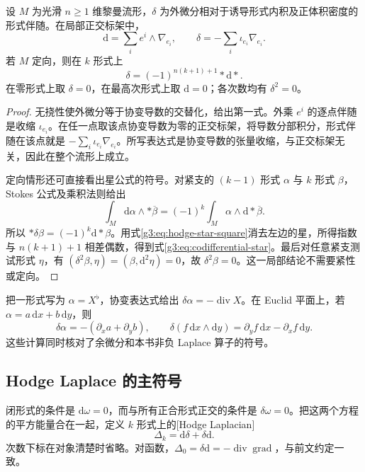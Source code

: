 \begin{proposition}\label{g3:prop:codifferential-star}
	设 \(M\) 为光滑 \(n\ge1\) 维黎曼流形，\(\delta\) 为外微分相对于诱导形式内积及正体积密度的形式伴随。在局部正交标架中，
	\begin{equation}\label{g3:eq:form-covariant-d-delta}
		\mathrm d=\sum_i e^i\wedge\nabla_{e_i},
		\qquad
		\delta=-\sum_i\iota_{e_i}\nabla_{e_i}.
	\end{equation}
	若 \(M\) 定向，则在 \(k\) 形式上
	\begin{equation}\label{g3:eq:codifferential-star}
		\delta=(-1)^{n(k+1)+1}*\mathrm d*.
	\end{equation}
	在零形式上取 \(\delta=0\)，在最高次形式上取 \(\mathrm d=0\)；各次数均有 \(\delta^2=0\)。
\end{proposition}
\begin{proof}
	无挠性使外微分等于协变导数的交替化，给出第一式。外乘 \(e^i\) 的逐点伴随是收缩 \(\iota_{e_i}\)。在任一点取该点协变导数为零的正交标架，将导数分部积分，形式伴随在该点就是 \(-\sum_i\iota_{e_i}\nabla_{e_i}\)。所写表达式是协变导数的张量收缩，与正交标架无关，因此在整个流形上成立。

	定向情形还可直接看出星公式的符号。对紧支的 \((k-1)\) 形式 \(\alpha\) 与 \(k\) 形式 \(\beta\)，Stokes 公式及乘积法则给出
	\[
		\int_M\mathrm d\alpha\wedge *\overline\beta
		=(-1)^k\int_M\alpha\wedge\mathrm d*\overline\beta.
	\]
	所以 \(*\delta\beta=(-1)^k\mathrm d*\beta\)。用式\eqref{g3:eq:hodge-star-square}消去左边的星，所得指数与 \(n(k+1)+1\) 相差偶数，得到式\eqref{g3:eq:codifferential-star}。最后对任意紧支测试形式 \(\eta\)，有
	\((\delta^2\beta,\eta)=(\beta,\mathrm d^2\eta)=0\)，故 \(\delta^2\beta=0\)。这一局部结论不需要紧性或定向。
\end{proof}

把一形式写为 \(\alpha=X^\flat\)，协变表达式给出 \(\delta\alpha=-\operatorname{div}X\)。在 Euclid 平面上，若 \(\alpha=a\,\mathrm dx+b\,\mathrm dy\)，则
\[
	\delta\alpha=-(\partial_xa+\partial_yb),\qquad
	\delta(f\,\mathrm dx\wedge\mathrm dy)
	=\partial_yf\,\mathrm dx-\partial_xf\,\mathrm dy.
\]
这些计算同时核对了余微分和本书非负 Laplace 算子的符号。

\subsection{Hodge Laplace 的主符号}
\label{g3:subsec:1501:02}
闭形式的条件是 \(\mathrm d\omega=0\)，而与所有正合形式正交的条件是 \(\delta\omega=0\)。把这两个方程的平方能量合在一起，定义 \(k\) 形式上的[Hodge Laplacian]
\[
	\Delta_k=\mathrm d\delta+\delta\mathrm d.
\]
次数下标在对象清楚时省略。对函数，\(\Delta_0=\delta\mathrm d=-\operatorname{div}\operatorname{grad}\)，与前文约定一致。


